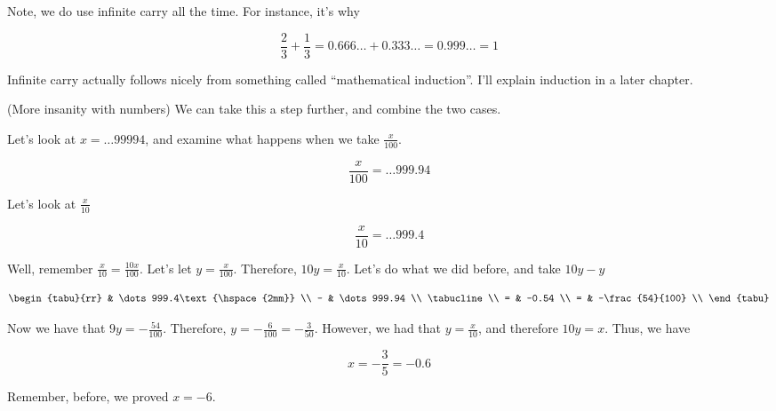 Note, we do use infinite carry all the time. For instance, it's why

\begin{displaymath}
  \frac{2}{3} + \frac{1}{3} = 0.666\dots + 0.333\dots = 0.999\dots = 1
\end{displaymath}

Infinite carry actually follows nicely from something called
``mathematical induction''. I'll explain induction in a later chapter.

\begin{example}(More insanity with numbers)
  We can take this a step further, and combine the two cases.

  Let's look at $x = \dots99994$, and examine what happens when we
  take $\frac{x}{100}$.

  \begin{displaymath}
    \frac{x}{100} = \dots999.94
  \end{displaymath}

  Let's look at $\frac{x}{10}$

  \begin{displaymath}
    \frac{x}{10} = \dots999.4
  \end{displaymath}

  Well, remember $\frac{x}{10} = \frac{10x}{100}$. Let's let
  $y = \frac{x}{100}$. Therefore, $10y = \frac{x}{10}$. Let's do what
  we did before, and take $10y - y$

  \begin{displaymath}
    \begin{tabu}{rr}
        & \dots999.4\text{\hspace{2mm}} \\
      - & \dots999.94 \\
      \tabucline \\
      = & -0.54 \\
      = & -\frac{54}{100} \\
    \end{tabu}
  \end{displaymath}

  Now we have that $9y = -\frac{54}{100}$. Therefore, $y =
  -\frac{6}{100} = -\frac{3}{50}$. However, we had that $y =
  \frac{x}{10}$, and therefore $10y = x$. Thus, we have

  \begin{displaymath}
    x = -\frac{3}{5} = -0.6
  \end{displaymath}

  Remember, before, we proved $x = -6$.
\end{example}

